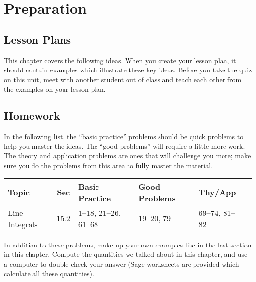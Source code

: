 \section{Preparation}

\subsection{Lesson Plans}

This chapter covers the following ideas. When you create your lesson plan, it should contain examples which illustrate these key ideas. Before you take the quiz on this unit, meet with another student out of class and teach each other from the examples on your lesson plan. 





\subsection{Homework}

In the following list, the ``basic practice'' problems should be quick
problems to help you master the ideas.  The ``good problems'' will
require a little more work.  The theory and application problems are
ones that will challenge you more; make sure you do the problems from
this area to fully master the material.  

{\noindent %
\begin{tabular}{|l|c|l|l|l|l|}\hline
Topic &Sec &Basic Practice &Good Problems &Thy/App \\\hline
Line Integrals & 15.2&1--18, 21--26, 61--68 & 19--20, 79 & 69--74, 81--82\\\hline
\end{tabular}

}

In addition to these problems, make up your own examples like in the
last section in this chapter.  Compute the quantities we talked about
in this chapter, and use a computer to double-check your answer (Sage
worksheets are provided which calculate all these quantities).


